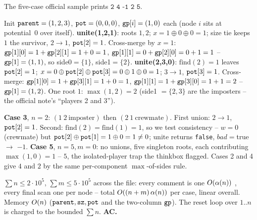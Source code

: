 The five-case official sample prints \(\texttt{2 4 -1 2 5}\).
\begin{tracebox}[CF 1594D case 1: n=3, comments (1 2 imposter), (2 3 crewmate)]
Init \(\texttt{parent}=(1,2,3)\), \(\texttt{pot}=(0,0,0)\),
\(\texttt{gp}[i]=(1,0)\) each (node \(i\) sits at potential~0 over itself).
\textbf{unite(1,2,1)}: roots \(1,2\); \(x=1\oplus0\oplus0=1\); size tie keeps
\(1\) the survivor, \(2\!\to\!1\), \(\texttt{pot}[2]=1\).
Cross-merge by \(x=1\): \(\texttt{gp}[1][0]=1+\texttt{gp}[2][1]=1+0=1\),
\(\texttt{gp}[1][1]=0+\texttt{gp}[2][0]=0+1=1\) -- \(\texttt{gp}[1]=(1,1)\),
so side0\(=\{1\}\), side1\(=\{2\}\).
\textbf{unite(2,3,0)}: \(\text{find}(2)=1\) leaves \(\texttt{pot}[2]=1\);
\(x=0\oplus\texttt{pot}[2]\oplus\texttt{pot}[3]=0\oplus1\oplus0=1\);
\(3\!\to\!1\), \(\texttt{pot}[3]=1\).
Cross-merge: \(\texttt{gp}[1][0]=1+\texttt{gp}[3][1]=1+0=1\),
\(\texttt{gp}[1][1]=1+\texttt{gp}[3][0]=1+1=2\) -- \(\texttt{gp}[1]=(1,2)\).
One root \(1\): \(\max(1,2)=\boxed{2}\) (side1 \(=\{2,3\}\) are the
imposters -- the official note's ``players 2 and 3'').
\end{tracebox}
\begin{tracebox}
\textbf{Case 3}, \(n=2\): \((1\ 2\ \text{imposter})\) then
\((2\ 1\ \text{crewmate})\).  First union: \(2\!\to\!1\),
\(\texttt{pot}[2]=1\).  Second: \(\text{find}(2)=\text{find}(1)=1\), so we test
consistency -- \(w=0\) (crewmate) but \(\texttt{pot}[2]\oplus\texttt{pot}[1]=1\oplus0=1\neq0\);
\(\text{unite}\) returns \texttt{false}, \(\mathit{bad}=\)true \(\to\)
\(\boxed{-1}\).  \textbf{Case 5}, \(n=5,m=0\): no unions, five singleton roots,
each contributing \(\max(1,0)=1\) -- \(\boxed{5}\), the isolated-player trap
the thinkbox flagged.  Cases 2 and 4 give \(\boxed{4}\) and \(\boxed{2}\) by
the same per-component \(\max\)-of-sides rule.
\end{tracebox}

\begin{complexitybox}
\(\sum n\le2\cdot10^5\), \(\sum m\le5\cdot10^5\) across the file: every
comment is one \(O(\alpha(n))\) , every final scan one
 per node -- total \(O((n+m)\,\alpha(n))\) per case, linear
overall.  Memory \(O(n)\) (\(\texttt{parent},\texttt{sz},\texttt{pot}\) and the
two-column \(\texttt{gp}\)).  The reset loop over \(1..n\) is charged to the
bounded \(\sum n\).  \textbf{AC.}
\end{complexitybox}

